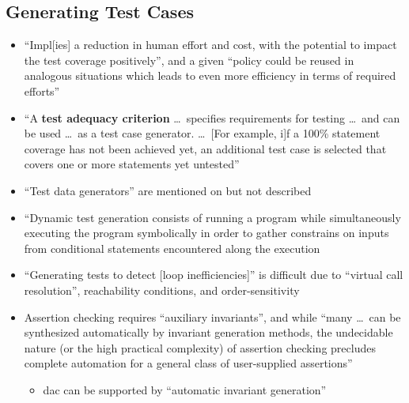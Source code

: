 \subsection{Generating Test Cases}

\begin{itemize}
      \item ``Impl[ies] a reduction in human effort and cost, with the
            potential to impact the test coverage positively'', and a given
            ``policy could be reused in analogous situations which leads to
            even more efficiency in terms of required efforts''
            \citep[p.~1187]{Moghadam2019}
      \item ``A \textbf{test adequacy criterion} \dots\ specifies requirements
            for testing \dots\ and can be used \dots\ as a test case generator. \dots\
            [For example, i]f a 100\% statement coverage has not been achieved
            yet, an additional test case is selected that covers one or more
            statements yet untested'' \citep[p.~402]{vanVliet2000}
      \item ``Test data generators'' are mentioned on
            \citep[p.~410]{vanVliet2000} but not described
      \item ``Dynamic test generation consists of running a program while
            simultaneously executing the program symbolically in order to
            gather constrains on inputs from conditional statements encountered
            along the execution \citep[p.~23]{GodefroidAndLuchaup2011}
            \todo{OG [11, 6]}
      \item ``Generating tests to detect [loop inefficiencies]'' is difficult
            due to ``virtual call resolution'', reachability conditions, and
            order-sensitivity \citep[p.~896]{DhokAndRamanathan2016}
      \item Assertion checking requires ``auxiliary invariants'', and while
            ``many \dots\ can be synthesized automatically by invariant
            generation methods, the undecidable nature (or the high practical
            complexity) of assertion checking precludes complete automation for
            a general class of user-supplied assertions''
            \citep[p.~345]{LahiriEtAl2013}
            \begin{itemize}
                  \item \acf{dac} can be supported by ``automatic invariant
                        generation'' \citep[p.~345]{LahiriEtAl2013}

\end{itemize}
\end{itemize}
